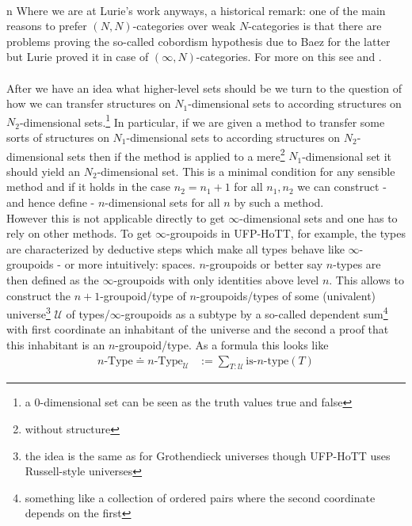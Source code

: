 \\n
Where we are at Lurie's work anyways, a historical remark: one of the main reasons to prefer $(N,N)$-categories over weak $N$-categories is that there are problems proving the so-called cobordism hypothesis due to Baez for the latter but Lurie proved it in case of $(\infty,N)$-categories. For more on this see \cite{ea5d49bf} and \cite{00000011}.
\\\\
After we have an idea what higher-level sets should be we turn to the question of how we can transfer structures on $N_{1}$-dimensional sets to according structures on $N_{2}$-dimensional sets.\footnote{a $0$-dimensional set can be seen as the truth values {\glqq}true{\grqq} and {\glqq}false{\grqq}} In particular, if we are given a method to transfer some sorts of structures on $N_{1}$-dimensional sets to according structures on $N_{2}$-dimensional sets then if the method is applied to a mere\footnote{without structure} $N_{1}$-dimensional set it should yield an $N_{2}$-dimensional set. This is a minimal condition for any sensible method and if it holds in the case $n_{2} = n_{1} + 1$ for all $n_{1},n_{2}$ we can construct - and hence define - $n$-dimensional sets for all $n$ by such a method.
\\
However this is not applicable directly to get $\infty$-dimensional sets and one has to rely on other methods. To get $\infty$-groupoids in UFP-HoTT, for example, the types are characterized by deductive steps which make all types behave like $\infty$-groupoids - or more intuitively: spaces. $n$-groupoids or better say $n$-types are then defined as the $\infty$-groupoids with only identities above level $n$. This allows to construct the $n+1$-groupoid/type of $n$-groupoids/types of some (univalent) universe\footnote{the idea is the same as for Grothendieck universes though UFP-HoTT uses Russell-style universes} $\mathcal{U}$ of types/$\infty$-groupoids as a subtype by a so-called dependent sum\footnote{something like a collection of ordered pairs where the second coordinate depends on the first} with first coordinate an inhabitant of the universe and the second a proof that this inhabitant is an $n$-groupoid/type. As a formula this looks like
\begin{align*}
  n\textrm{-Type}
  \doteq
  n\textrm{-Type}_{\mathcal{U}}
  &:=
  \sum_{T \colon \mathcal{U}}
  \textrm{is-}n\textrm{-type}(T)
\end{align*}
